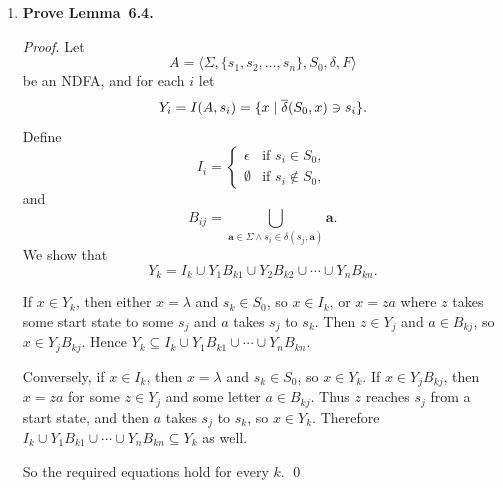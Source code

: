 \begin{enumerate}[{6.}1.]
\begin{proof}
If $R=R_1\cdot R_2$, then by Definition~6.5,
\[
\overline{s}(R_1\cdot R_2)=\overline{s}(R_1)\cdot\overline{s}(R_2).
\]
So the substituted expression $R_1'R_2'$ represents $\overline{s}(R)$.

If $R=R_1\cup R_2$, then
\[
\overline{s}(R_1\cup R_2)=\overline{s}(R_1)\cup\overline{s}(R_2),
\]
so the substituted expression $R_1'\cup R_2'$ represents $\overline{s}(R)$.

If $R=(R_1)^*$, then
\[
\overline{s}((R_1)^*)=(\overline{s}(R_1))^*,
\]
so $(R_1')^*$ represents $\overline{s}(R)$.

Thus substitution preserves each of the three operators used to build regular
expressions.  By induction on the number of operators in $R$, the expression
obtained by substituting $s(\pmb{a})$ for each letter $\pmb{a}$ represents
exactly $\overline{s}(R)$.  Therefore \RSIG\ is closed under substitution. \qed
\end{proof}

\item \textbf{Prove Lemma~6.4.}

\begin{proof}
Let
\[
A=\langle\Sigma,\{s_1,s_2,\ldots,s_n\},S_0,\delta,F\rangle
\]
be an NDFA, and for each $i$ let
\[
Y_i=I(A,s_i)=\{x\mid \overline{\delta}(S_0,x)\ni s_i\}.
\]
Define
\[
I_i=
\begin{cases}
\epsilon & \text{if } s_i\in S_0,\\
\emptyset & \text{if } s_i\notin S_0,
\end{cases}
\]
and
\[
B_{ij}=\bigcup_{\pmb{a}\in\Sigma \wedge  s_i\in\delta(s_j,\pmb{a})}\pmb{a}.
\]
We show that
\[
Y_k=I_k\cup Y_1B_{k1}\cup Y_2B_{k2}\cup\cdots\cup Y_nB_{kn}.
\]

If $x\in Y_k$, then either $x=\lambda$ and $s_k\in S_0$, so $x\in I_k$, or
$x=za$ where $z$ takes some start state to some $s_j$ and $a$ takes $s_j$ to
$s_k$.  Then $z\in Y_j$ and $a\in B_{kj}$, so $x\in Y_jB_{kj}$.  Hence
$Y_k\subseteq I_k\cup Y_1B_{k1}\cup\cdots\cup Y_nB_{kn}$.

Conversely, if $x\in I_k$, then $x=\lambda$ and $s_k\in S_0$, so $x\in Y_k$.
If $x\in Y_jB_{kj}$, then $x=za$ for some $z\in Y_j$ and some letter
$a\in B_{kj}$.  Thus $z$ reaches $s_j$ from a start state, and then $a$ takes
$s_j$ to $s_k$, so $x\in Y_k$.  Therefore
$I_k\cup Y_1B_{k1}\cup\cdots\cup Y_nB_{kn}\subseteq Y_k$ as well.

So the required equations hold for every $k$. \qed
\end{proof}


\end{enumerate}
